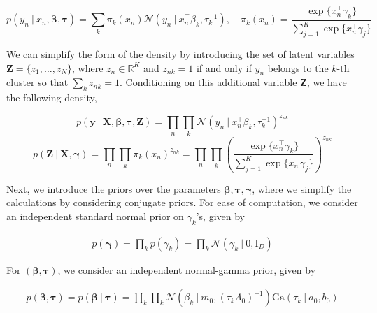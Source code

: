 \documentclass[twoside,11pt]{article}
\newcommand{\eye}{\mathrm{I}}
\newcommand\given[1][]{\:#1\vert\:}
\newcommand{\transpose}[1]{#1^{\intercal}}
\newcommand{\R}{\mathbb{R}}
\newcommand{\nprod}{\prod\limits_{n}}
\newcommand{\kprod}{\prod\limits_{k}}
\newcommand{\ksum}{\sum\limits_{k}}
\newcommand{\boldbeta}{\boldsymbol\beta}
\newcommand{\boldgamma}{\boldsymbol\gamma}
\newcommand{\boldtau}{\boldsymbol\tau}
\newcommand{\sumexp}{\sum_{j=1}^{K} \exp \{ \transpose{x_n} \gamma_j \}}
\newcommand{\pr}[1]{p \left( #1 \right)}
\begin{document}
\begin{equation} \label{eq:mix_density}
	 \pr{y_n \given x_n, \boldbeta, \boldtau} = \ksum \pi_k(x_n) \mathcal{N} \left( y_n \given \transpose{x_n}\beta_k, \tau_k^{-1} \right), \quad \pi_k(x_n) = \frac{\exp\{\transpose{x_n} \gamma_k\}}{\sum\limits_{j=1}^{K} \exp\{ \transpose{x_n} \gamma_j\}}
\end{equation}

We can simplify the form of the density by introducing the set of latent variables $\mathbf{Z} = \{ z_1, \ldots, z_N \}$, where $z_n \in \R^K$ and $z_{nk} = 1$ if and only if $y_n$ belongs to the $k$-th cluster so that $\sum_{k} z_{nk} = 1$. Conditioning on this additional variable $\mathbf{Z}$, we have the following density, 


\begin{equation} \label{eq:simp_lik}
	p \left( \mathbf{y} \given \mathbf{X}, \boldsymbol\beta, \boldsymbol{\tau}, \mathbf{Z} \right) = 
	\prod_{n} \prod_{k} \mathcal{N} \left( y_n \given \transpose{x_n} \beta_k, \tau_{k}^{-1} \right)^{z_{nk}}
\end{equation}
\begin{equation} \label{eq:z_prior}
	p \left( \mathbf{Z} \given \mathbf{X}, \boldsymbol\gamma \right) = \nprod \kprod \pi_{k} (x_n)^{z_{nk}} = 
	\nprod \kprod \left( \frac{\exp\{\transpose{x_n} \gamma_k\}}{\sumexp}\right)^{z_{nk}}
\end{equation}

Next, we introduce the priors over the parameters $\boldbeta, \boldtau, \boldgamma$, where we simplify the calculations by considering conjugate priors. For ease of computation, we consider an independent standard normal prior on $\gamma_k$'s, given by

\begin{equation} \label{eq:gamma_prior}
\begin{split}
	 p(\boldgamma) = \kprod p(\gamma_k) = \kprod \mathcal{N} \left( \gamma_k \given 0, \eye_D \right)
\end{split}
\end{equation}

For $(\boldbeta, \boldtau)$, we consider an independent normal-gamma prior, given by

\begin{equation} \label{eq:betatau_prior}
\begin{split}
	 p\left( \boldbeta, \boldtau \right) = \pr{\boldbeta \given \boldtau} = \prod_{k} \kprod \mathcal{N} \left( \beta_k \given m_0, (\tau_k \Lambda_0)^{-1} \right) \mathrm{Ga} \left( \tau_k \given a_0, b_0 \right)
\end{split}
\end{equation}
\end{document}

